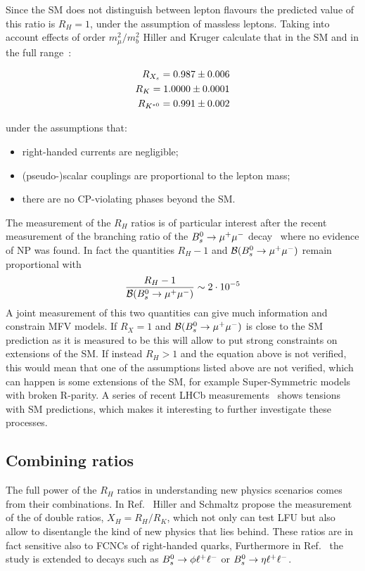 Since the SM does not distinguish between lepton flavours the predicted value of this ratio 
is $R_H = 1$, under the assumption of massless leptons. Taking into account effects of order 
$m_\mu^2 / m_b^2$ Hiller and Kruger calculate that in the SM and in the full \qsq range~\cite{Hiller:2003js}:

\begin{align}
R_{X_s} = 0.987 \pm 0.006 \\
R_K = 1.0000 \pm 0.0001 \\
R_{{{K}^{*0}}} = 0.991 \pm 0.002 \\
\end{align}

\noindent
under the assumptions that:

\begin{itemize}
\item right-handed currents are negligible;
\item (pseudo-)scalar couplings are proportional to the lepton mass;
\item there are no CP-violating phases beyond the SM.
\end{itemize}

The measurement of the $R_H$ ratios is of particular interest after the recent
measurement of the branching ratio of the ${{B}^0_{s}}\rightarrow{\ensuremath{\mu^+\mu^-}}$ decay~\cite{CMS:2014xfa} 
where no evidence of NP was found. In fact the quantities $R_H - 1$ and
${\cal B}({{B}^0_{s}} \rightarrow {\ensuremath{\mu^+\mu^-}})$ remain proportional with
%
\begin{equation}
\frac{R_H - 1}{{\cal B}({{B}^0_{s}} \rightarrow {\ensuremath{\mu^+\mu^-}})} \sim 2 \cdot 10^{-5}
\end{equation}
%
A joint measurement of this two quantities can give much information and constrain MFV models.
If $R_X = 1$ and ${\cal B}({{B}^0_{s}} \rightarrow {\ensuremath{\mu^+\mu^-}})$ is close to the SM prediction as it is measured to be
this will allow to put strong constraints on extensions of the SM.
If instead $R_H > 1$ and the equation above is not verified, this would mean that one of the
assumptions listed above are not verified, which can happen is some extensions of the SM,
for example Super-Symmetric models with broken R-parity.
A series of recent LHCb measurements~\cite{TomRDreview} shows tensions with
SM predictions, which makes it interesting to further investigate these processes.

\subsection{Combining ratios}

The full power of the $R_H$ ratios in understanding new physics scenarios comes from
their combinations.  In Ref.~\cite{Hiller:2014ula} Hiller and Schmaltz propose the measurement of the
of double ratios, $X_H = R_H / R_K$, which not only can test LFU but also allow
to disentangle the kind of new physics that lies behind. These ratios are in fact sensitive
also to FCNCs of right-handed quarks, Furthermore in Ref.~\cite{Hiller:2014ula} the study is extended
to \Bs decays such as ${{B}^0_{s}}\rightarrow\phi\ell^+ \ell^-$ or $\Bs\to\eta\ll$.


